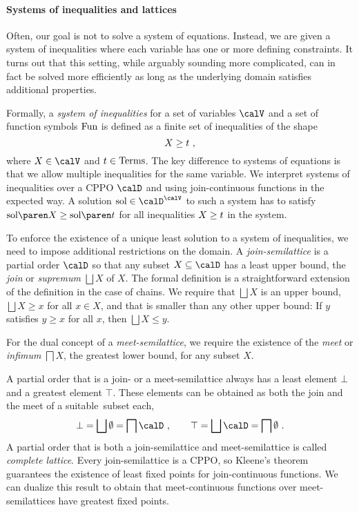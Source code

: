 \documentclass[../../diss.tex]{subfiles}
\begin{document}
\paragraph{Systems of inequalities and lattices}

Often, our goal is not to solve a system of equations.
Instead, we are given a system of inequalities where each variable has one or more defining constraints.
It turns out that this setting, while arguably sounding more complicated, can in fact be solved more efficiently as long as the underlying domain satisfies additional properties.

Formally, a \emph{system of inequalities} for a set of variables $\vars$ and a set of function symbols $\text{Fun}$ is defined as a finite set of inequalities of the shape
\[
    X \geq t
    \ ,
\]
where $X \in \vars$ and $t \in \text{Terms}$.
The key difference to systems of equations is that we allow  multiple inequalities for the same variable.
We interpret systems of inequalities over a CPPO $\domain$ and using join-continuous functions in the expected way.
A solution $\sol \in \domain^\vars$ to such a system has to satisfy $\sol{X} \geq \sol{\term}$ for all inequalities $X \geq t$ in the system.

To enforce the existence of a unique least solution to a system of inequalities, we need to impose additional restrictions on the domain.
A \emph{join-semilattice} is a partial order $\domain$ so that any subset $X \subseteq \domain$ has a least upper  bound, the \emph{join} or \emph{supremum} $\bigsqcup X$ of $X$.
The formal definition is a straightforward extension of the definition in the case of chains.
We require that $\bigsqcup X$ is an upper bound, \ie $\bigsqcup X \geq x$ for all $x \in X$, and that is smaller than any other upper bound:
If $y$ satisfies $y \geq x$ for all $x$, then $\bigsqcup X \leq y$.

For the dual concept of a \emph{meet-semilattice}, we require the existence of the \emph{meet} or \emph{infimum} $\bigsqcap X$, the greatest lower bound, for any subset $X$.

A partial order that is a join- or a meet-semilattice always has a least element $\bot$ and a greatest element $\top$.
These elements can be obtained as both the join and the meet of a suitable~subset each,
\[
    \bot = \bigsqcup \emptyset = \bigsqcap \domain
    \ ,
    \qquad
    \top = \bigsqcup \domain = \bigsqcap \emptyset
    \ .
\]
A partial order that is both a join-semilattice and meet-semilattice is called \emph{complete lattice}.
Every join-semilattice is a CPPO, so Kleene's theorem guarantees the existence of least fixed points for join-continuous functions.
We can dualize this result to obtain that meet-continuous functions over meet-semilattices have greatest fixed points.
\end{document}
